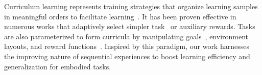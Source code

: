 \vspace{-0.5em}

Curriculum learning represents training strategies that organize learning samples in meaningful orders to facilitate learning~\citep{bengio2009curriculum}.
It has been proven effective in numerous works that adaptively select simpler task~\citep{Narvekar2017AutonomousTS, Svetlik2017AutomaticCG, riedmiller2018learning, Peng2018CurriculumDF, Czarnecki2018MixMatchA, matiisen2019teacher, narvekar2019learning, Lin2019AdaptiveAT} or auxiliary rewards\citep{Jaderberg2017ReinforcementLW, shen2019situational}. Tasks are also parameterized to form curricula by manipulating goals~\citep{Forestier2017IntrinsicallyMG, Held2018AutomaticGG, Racanire2020AutomatedCG}, environment layouts\citep{wohlke2020performance, baker2019emergent, Portelas2019TeacherAF}, and reward functions~\citep{Gupta2018UnsupervisedMF, Jabri2019UnsupervisedCF}.
Inspired by this paradigm, our work harnesses the improving nature of sequential experiences to boost learning efficiency and generalization for embodied tasks.

\vspace{-0.5em}

